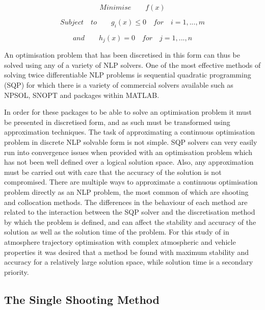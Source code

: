 \begin{equation}
Minimise \qquad f(x)
\end{equation}

\begin{equation}
Subject \quad to \qquad g_i(x)\leq0 \quad for \quad i=1,...,m
\end{equation}

\begin{equation}
and \qquad h_j(x) = 0 \quad for \quad j=1,...,n
\end{equation}

An optimisation problem that has been discretised in this form can thus be solved using any of a variety of NLP solvers. One of the most effective methods of solving twice differentiable NLP problems is sequential quadratic programming (SQP) \cite{Boggs2000} for which there is a variety of commercial solvers available such as NPSOL, SNOPT and packages within MATLAB. 

In order for these packages to be able to solve an optimisation problem it must be presented in discretised form, and as such must be transformed using approximation techniques. The task of approximating a continuous optimisation problem in discrete NLP solvable form is not simple. SQP solvers can very easily run into convergence issues when provided with an optimisation problem which has not been well defined over a logical solution space. Also, any approximation must be carried out with care that the accuracy of the solution is not compromised. There are multiple ways to approximate a continuous optimisation problem directly as an NLP problem, the most common of which are shooting and collocation methods. The differences in the behaviour of each method are related to the interaction between the SQP solver and the discretisation method by which the problem is defined, and can affect the stability and accuracy of the solution as well as the solution time of the problem. For this study of in atmosphere trajectory optimisation with complex atmospheric and vehicle properties it was desired that a method be found with maximum stability and accuracy for a relatively large solution space, while solution time is a secondary priority.
\subsection{The Single Shooting Method}


